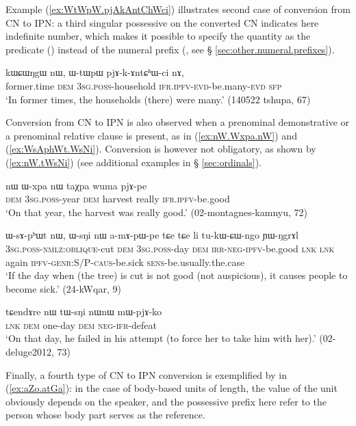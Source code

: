 Example (\ref{ex:WtWpW.pjAkAntChWci}) illustrates second case of conversion from CN to IPN: a third singular possessive on the converted CN indicates here indefinite number, which makes it possible to specify the quantity as the predicate () instead of the numeral prefix (, see § \ref{sec:other.numeral.prefixes}).

\begin{exe}
\ex \label{ex:WtWpW.pjAkAntChWci}
 \gll kɯɕɯŋgɯ nɯ, ɯ-tɯpɯ pjɤ-k-ɤntɕʰɯ-ci nɤ, \\
 former.time \textsc{dem} \textsc{3sg}.\textsc{poss}-household \textsc{ifr}.\textsc{ipfv}-\textsc{evd}-be.many-\textsc{evd} \textsc{sfp} \\
\glt `In former times, the households (there) were many.' (140522 tshupa, 67)
\end{exe}

Conversion from CN to IPN is also observed when a prenominal demonstrative or a prenominal relative clause is present, as in (\ref{ex:nW.Wxpa.nW}) and (\ref{ex:WsAphWt.WsNi}). Conversion is however not obligatory, as shown by (\ref{ex:nW.tWsNi}) (see additional examples in § \ref{sec:ordinals}).

\begin{exe}
\ex \label{ex:nW.Wxpa.nW}
\gll nɯ ɯ-xpa nɯ taχpa wuma pjɤ-pe \\
\textsc{dem} \textsc{3sg}.\textsc{poss}-year \textsc{dem} harvest really \textsc{ifr}.\textsc{ipfv}-be.good \\
\glt `On that year, the harvest was really good.' (02-montagnes-kamnyu, 72)
\end{exe}

\begin{exe}
\ex \label{ex:WsAphWt.WsNi}
\gll ɯ-sɤ-pʰɯt nɯ, ɯ-sŋi nɯ a-mɤ-pɯ-pe tɕe tɕe li tu-kɯ-ɕɯ-ngo ɲɯ-ŋgrɤl \\
\textsc{3sg}.\textsc{poss}-\textsc{nmlz}:\textsc{oblique}-cut \textsc{dem} \textsc{3sg}.\textsc{poss}-day \textsc{dem} \textsc{irr}-\textsc{neg}-\textsc{ipfv}-be.good \textsc{lnk} \textsc{lnk} again \textsc{ipfv}-\textsc{genr}:S/P-\textsc{caus}-be.sick \textsc{sens}-be.usually.the.case \\
\glt `If the day when (the tree) is cut is not good (not auspicious), it causes people to become sick.' (24-kWqar, 9)
\end{exe}

\begin{exe}
\ex \label{ex:nW.tWsNi}
\gll tɕendɤre nɯ tɯ-sŋi nɯnɯ mɯ-pjɤ-ko \\
\textsc{lnk} \textsc{dem} one-day \textsc{dem} \textsc{neg}-\textsc{ifr}-defeat \\
\glt `On that day, he failed in his attempt (to force her to take him with her).' (02-deluge2012, 73)
\end{exe}
Finally, a fourth type of CN to IPN conversion is exemplified by  in (\ref{ex:aZo.atGa}): in the case of body-based units of length, the value of the unit obviously depends on the speaker, and the possessive prefix here refer to the person whose body part serves as the reference.

